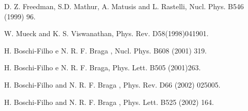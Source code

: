 \documentclass[a4paper,twocolumn,prd,groupedaddress,nofootinbib]{revtex4}
\begin{document}
\begin{thebibliography}{100}
 D. Z. Freedman, S.D. Mathur, A. Matusis and L. Rastelli,
Nucl. Phys. B546 (1999) 96.
 
 W. Mueck and K. S. Viswanathan, Phys. Rev. D58(1998)041901.

 H. Boschi-Filho e N. R. F. Braga , Nucl. Phys.  B608 (2001) 
319.

  H. Boschi-Filho e N. R. F. Braga, Phys. Lett. B505
 (2001)263.

 H. Boschi-Filho and N. R. F. Braga , Phys. Rev. D66 (2002) 025005.

 H. Boschi-Filho and N. R. F. Braga , Phys. Lett. B525 (2002) 164.


\end{thebibliography}
\end{document}
